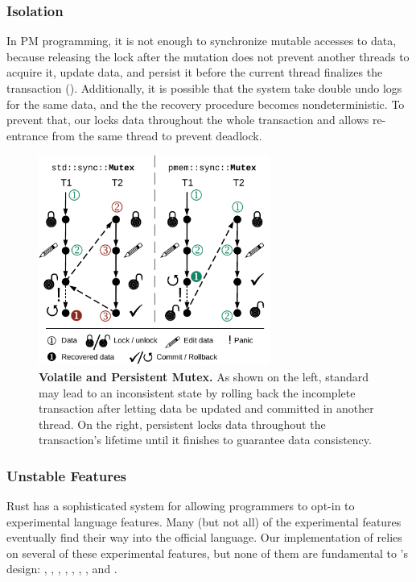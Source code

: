 \subsubsection{Isolation}

In PM programming, it is not enough to synchronize mutable accesses to data, because releasing the lock after the mutation does not prevent another threads to acquire it, update data, and persist it before the current thread finalizes the transaction (). Additionally, it is possible that the system take double undo logs for the same data, and the the recovery procedure becomes nondeterministic. To prevent that, our  locks data throughout the whole transaction and allows re-entrance from the same thread to prevent deadlock.

\begin{figure}%
    \begin{center}
    \includegraphics[width=3in]{Figures/tramutex.pdf}
    \end{center}
    \caption{\label{fig:mutex} {\bf Volatile and Persistent Mutex.} As shown on the left, standard  may lead to an inconsistent state by rolling back the incomplete transaction after letting data be updated and committed in another thread. On the right, persistent  locks data throughout the transaction's lifetime until it finishes to guarantee data consistency.}
\end{figure}

\subsubsection{Unstable Features}

Rust has a sophisticated system for allowing programmers to opt-in to
experimental language features.  Many (but not all) of the experimental
features eventually find their way into the official language.  Our
implementation of \this{} relies on several of these experimental features, but
none of them are fundamental to \this{}'s design: , , , , , , , and .


